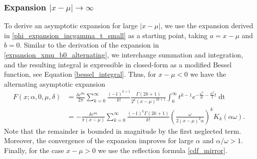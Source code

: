 \documentclass[10pt,a4paper,oneside]{article}
\numberwithin{equation}{section}
\begin{document}
\subsubsection{Expansion $|x-\mu| \to \infty$}
To derive an asymptotic expansion for large $|x-\mu|$, we use the expansion derived in \eqref{phi_expansion_incgamma_t_small} as a starting point, taking $a = x-\mu$ and $b = 0$. Similar to the derivation of the expansion in \eqref{expansion_xmu_b0_alternating}, we interchange summation and integration, and the resulting integral is expressible in closed-form as a modified Bessel function, see Equation \eqref{bessel_integral}. Thus, for $x - \mu < 0$ we have the alternating asymptotic expansion
\begin{align}\label{asymptotic_expansion_xmu_b0}
F(x; \alpha, 0, \mu, \delta) &= \frac{\delta e^{\delta \alpha}}{2\pi} \sum_{k=0}^{\infty} \frac{(-1)^{k+1}}{k!} \frac{\Gamma(2k + 1)}{2^k (x-\mu)^{2k + 1}} \int_0^{\infty} t^{k-1} e^{-\frac{\omega^2}{2t} - \frac{\alpha^2}{2}t} \mathop{dt} \nonumber \\
&= -\frac{\delta e^{\delta \alpha}}{\pi (x-\mu)} \sum_{k=0}^{\infty}\frac{(-1)^k\Gamma(2k + 1)}{k!} \left(\frac{\omega}{2(x-\mu)^2\alpha}\right)^k K_k(\alpha \omega).
\end{align}
Note that the remainder is bounded in magnitude by the first neglected term. Moreover, the convergence of the expansion improves for large $\alpha$ and $\alpha / \omega > 1$. Finally, for the case $x - \mu > 0$ we use the reflection formula \eqref{cdf_mirror}.
\end{document}
